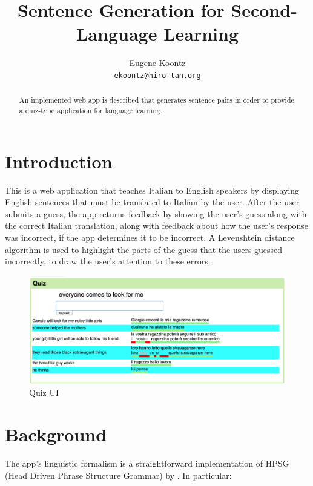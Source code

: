 \documentclass[11pt]{article}
\title{Sentence Generation for Second-Language Learning}
\author{Eugene Koontz\\
  {\tt ekoontz@hiro-tan.org} }
\date{}
\begin{document}
\maketitle
\begin{abstract}
  An implemented web app is described that generates sentence pairs in
  order to provide a quiz-type application for language learning.
\end{abstract}

\section{Introduction}

This is a web application that teaches Italian to English speakers by
displaying English sentences that must be translated to Italian by the
user. After the user submits a guess, the app returns feedback by
showing the user's guess along with the correct Italian translation,
along with feedback about how the user's response was incorrect, if
the app determines it to be incorrect. A Levenshtein distance
algorithm is used to highlight the parts of the guess that the users
guessed incorrectly, to draw the user's attention to these errors.

\begin{figure}[H]
  \includegraphics[scale=0.20]{quiz}
  \caption{Quiz UI}
\end{figure}

\section{Background}

The app's linguistic formalism is a straightforward implementation of
HPSG (Head Driven Phrase Structure Grammar) by \cite{PS:94}. In
particular:
\end{document}
